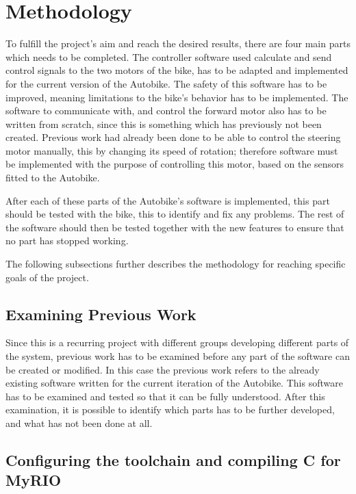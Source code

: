 \chapter{Methodology}

To fulfill the project's aim and reach the desired results, there are four main parts which needs to be completed. The controller software used calculate and send control signals to the two motors of the bike, has to be adapted and implemented for the current version of the Autobike. The safety of this software has to be improved, meaning limitations to the bike's behavior has to be implemented. The software to communicate with, and control the forward motor also has to be written from scratch, since this is something which has previously not been created. Previous work had already been done to be able to control the steering motor manually, this by changing its speed of rotation; therefore software must be implemented with the purpose of controlling this motor, based on the sensors fitted to the Autobike.

After each of these parts of the Autobike's software is implemented, this part should be tested with the bike, this to identify and fix any problems. The rest of the software should then be tested together with the new features to ensure that no part has stopped working.

The following subsections further describes the methodology for reaching specific goals of the project.

\section{Examining Previous Work}

Since this is a recurring project with different groups developing different parts of the system, previous work has to be examined before any part of the software can be created or modified. In this case the previous work refers to the already existing software written for the current iteration of the Autobike. This software has to be examined and tested so that it can be fully understood. After this examination, it is possible to identify which parts has to be further developed, and what has not been done at all.

\section{Configuring the toolchain and compiling C for MyRIO}
\label{toolchain}

